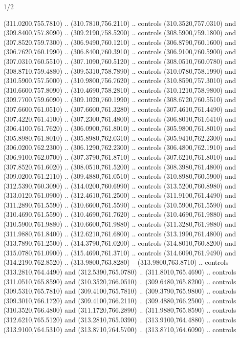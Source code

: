 \begin{flagdescription}{1/2}
\begin{scope}[xshift=0.5\flaglength]
\begin{scope}[scale=0.00745\flagwidth,xshift=-12.1mm,yshift=41.7mm]
\begin{scope}[y=0.80pt, x=0.80pt, yscale=-1, xscale=1, inner sep=0pt, outer sep=0pt]
\begin{scope}[cm={{1.33333,0.0,0.0,-1.33333,(0.0,114.66667)}}]
\begin{scope}[scale=0.100]
  (311.0200,755.7810) .. (310.7810,756.2110) .. controls (310.3520,757.0310) and
  (309.8400,757.8090) .. (309.2190,758.5200) .. controls (308.5900,759.1800) and
  (307.8520,759.7300) .. (306.9490,760.1210) .. controls (306.8790,760.1600) and
  (306.7620,760.1990) .. (306.8400,760.3910) .. controls (306.9100,760.5900) and
  (307.0310,760.5510) .. (307.1090,760.5120) .. controls (308.0510,760.0780) and
  (308.8710,759.4880) .. (309.5310,758.7890) .. controls (310.0780,758.1990) and
  (310.5900,757.5000) .. (310.9800,756.7620) .. controls (310.8590,757.3010) and
  (310.6600,757.8090) .. (310.4690,758.2810) .. controls (310.1210,758.9800) and
  (309.7700,759.6090) .. (309.1020,760.1990) .. controls (308.6720,760.5510) and
  (307.6600,761.0510) .. (307.6600,761.3280) .. controls (307.4610,761.4490) and
  (307.4220,761.4100) .. (307.2300,761.4800) .. controls (306.8010,761.6410) and
  (306.4100,761.7620) .. (306.0900,761.8010) .. controls (305.9800,761.8010) and
  (305.8980,761.8010) .. (305.8980,762.0310) .. controls (305.9410,762.2300) and
  (306.0200,762.2300) .. (306.1290,762.2300) .. controls (306.4800,762.1910) and
  (306.9100,762.0700) .. (307.3790,761.8710) .. controls (307.6210,761.8010) and
  (307.8520,761.6020) .. (308.0510,761.5200) .. controls (308.3980,761.4800) and
  (309.0200,761.2110) .. (309.4880,761.0510) .. controls (310.8980,760.5900) and
  (312.5390,760.3090) .. (314.0200,760.6990) .. controls (313.5200,760.8980) and
  (313.0120,761.0900) .. (312.4610,761.2500) .. controls (311.9100,761.4490) and
  (311.2890,761.5590) .. (310.6600,761.5590) .. controls (310.5900,761.5590) and
  (310.4690,761.5590) .. (310.4690,761.7620) .. controls (310.4690,761.9880) and
  (310.5900,761.9880) .. (310.6600,761.9880) .. controls (311.3280,761.9880) and
  (311.9880,761.8400) .. (312.6210,761.6800) .. controls (313.1990,761.4800) and
  (313.7890,761.2500) .. (314.3790,761.0200) .. controls (314.8010,760.8200) and
  (315.0780,761.0900) .. (315.4690,761.3710) .. controls (314.6090,761.9490) and
  (314.2190,762.8520) .. (313.9800,763.8280) -- (313.9800,763.8710) .. controls
  (313.2810,764.4490) and (312.5390,765.0780) .. (311.8010,765.4690) .. controls
  (311.0510,765.8590) and (310.3520,766.0510) .. (309.6480,765.8200) .. controls
  (309.5310,765.7810) and (309.4100,765.7810) .. (309.3790,765.9800) .. controls
  (309.3010,766.1720) and (309.4100,766.2110) .. (309.4880,766.2500) .. controls
  (310.3520,766.4800) and (311.1720,766.2890) .. (311.9880,765.8590) .. controls
  (312.6210,765.5120) and (313.2810,765.0390) .. (313.9100,764.4880) .. controls
  (313.9100,764.5310) and (313.8710,764.5700) .. (313.8710,764.6090) .. controls

\end{scope}
\end{scope}
\end{scope}
\end{scope}
\end{scope}
\end{flagdescription}
